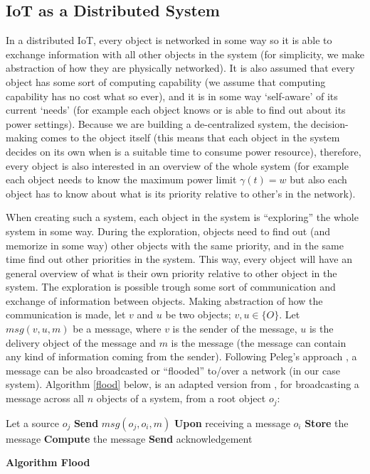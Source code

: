 \documentclass[letterpaper, 10 pt, conference]{ieeeconf}
\begin{document}
\subsection{IoT as a Distributed System}

In a distributed IoT, every object is networked in some way so it is able to exchange information with all other objects in the system (for simplicity, we make abstraction of how they are physically networked). It is also assumed that every object has some sort of computing capability (we assume that computing capability has no cost what so ever), and it is in some way `self-aware' of its current `needs' (for example each object knows or is able to find out about its power settings). Because we are building a de-centralized system, the decision-making comes to the object itself (this means that each object in the system decides on its own when is a suitable time to consume power resource), therefore, every object is also interested in an overview of the whole system (for example each object needs to know the maximum power limit $\gamma(t)= w$ but also each object has to know about what is its priority relative to other's in the network).

When creating such a system, each object in the system is ``exploring'' the whole system in some way. During the exploration, objects need to find out (and memorize in some way) other objects with the same priority, and in the same time find out other priorities in the system. This way, every object will have an general overview of what is their own priority relative to other object in the system. The exploration is possible trough some sort of communication and exchange of information between objects. Making abstraction of how the communication is made, let $v$ and $u$ be two objects; $v,u \in\{O\}$. Let $msg(v,u,m)$ be a message, where $v$ is the sender of the message, $u$ is the delivery object of the message and $m$ is the message (the message can contain any kind of information coming from the sender). Following Peleg's approach \cite{peleg2000distributed}, a message can be also broadcasted or ``flooded'' to/over a network (in our case system). Algorithm \ref{flood} below, is an adapted version from \cite{peleg2000distributed}, for broadcasting a message across all $n$ objects of a system, from a root object $o_{j}$:

\LinesNumbered
\IncMargin{1em}
\begin{algorithm}
Let a source $o_{j}$
\BlankLine
{} {
     {	
        \textbf{Send} \emph{$msg(o_{j},o_{i},m)$}
    }
}
 {
    \textbf{Upon} receiving a message $o_{i}$ \newline
       \textbf{Store} the message\newline
       \textbf{Compute} the message\newline
       \textbf{Send} acknowledgement
}
\caption{\textbf{Algorithm Flood}} \label{flood}
\end{algorithm}
\DecMargin{1em}
\end{document}
